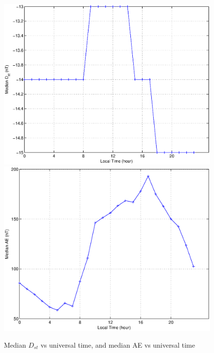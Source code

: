 \documentclass[10pt,twocolumn]{article}
\begin{document}
\begin{figure}[htp!]
\includegraphics[scale=0.45]{paperfigures/DstLT.eps}
\includegraphics[scale=0.45]{paperfigures/AELT.eps}
\caption{Median $D_{st}$ vs universal time, and median AE vs universal time}
\end{figure}
\clearpage

\newpage

\end{document}
